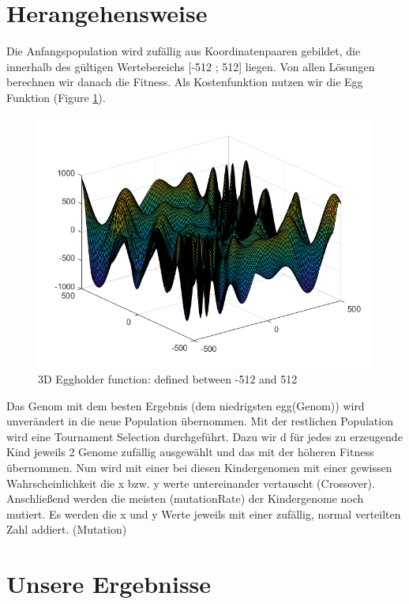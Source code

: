 \documentclass{hbrs-ecta-report}
\begin{document}
\FloatBarrier

\section{Herangehensweise}
Die Anfangspopulation wird zufällig aus Koordinatenpaaren gebildet, die innerhalb des gültigen Wertebereichs [-512 ; 512] liegen. Von allen Lösungen berechnen wir danach die Fitness. Als Kostenfunktion nutzen wir die Egg Funktion (Figure \ref{fig:egg}). 

\begin{figure}[h]
	\includegraphics[width=\linewidth]{img/egg}
	\caption{3D Eggholder function: defined between -512 and 512}
	\label{fig:egg}
\end{figure}

Das Genom mit dem besten Ergebnis (dem niedrigsten egg(Genom)) wird unverändert in die neue Population übernommen.
Mit der restlichen Population wird eine Tournament Selection durchgeführt. Dazu wir d für jedes zu erzeugende Kind jeweils 2 Genome zufällig  ausgewählt und das mit der höheren Fitness übernommen. \newline
Nun wird mit einer bei diesen Kindergenomen mit einer gewissen Wahrscheinlichkeit die x bzw. y werte untereinander vertauscht (Crossover).
\newline
Anschließend werden die meisten (mutationRate) der Kindergenome noch mutiert. Es werden die x und y Werte jeweils mit einer zufällig, normal verteilten Zahl addiert. (Mutation)

\FloatBarrier
\newpage

\section{Unsere Ergebnisse}
\end{document}
